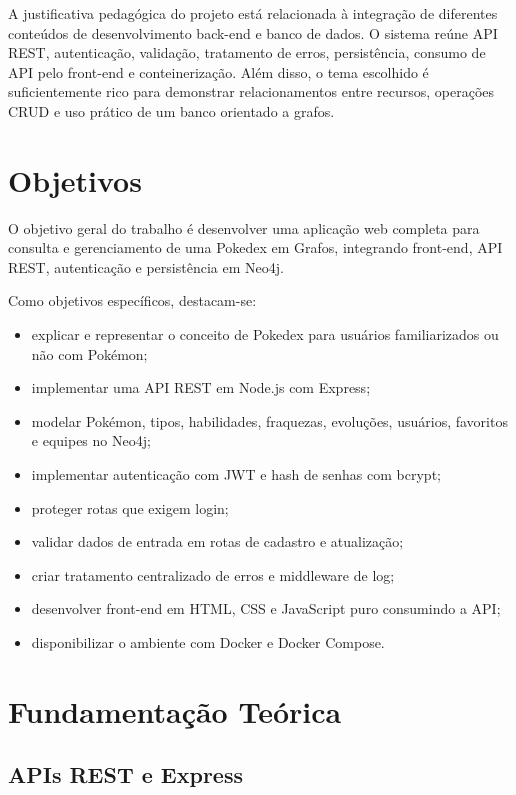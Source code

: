 \documentclass[12pt]{article}
\begin{document}
A justificativa pedagógica do projeto está relacionada à integração de diferentes conteúdos de desenvolvimento back-end e banco de dados. O sistema reúne API REST, autenticação, validação, tratamento de erros, persistência, consumo de API pelo front-end e conteinerização. Além disso, o tema escolhido é suficientemente rico para demonstrar relacionamentos entre recursos, operações CRUD e uso prático de um banco orientado a grafos.

\section{Objetivos}

O objetivo geral do trabalho é desenvolver uma aplicação web completa para consulta e gerenciamento de uma Pokedex em Grafos, integrando front-end, API REST, autenticação e persistência em Neo4j.

Como objetivos específicos, destacam-se:

\begin{itemize}
  \item explicar e representar o conceito de Pokedex para usuários familiarizados ou não com Pokémon;
  \item implementar uma API REST em Node.js com Express;
  \item modelar Pokémon, tipos, habilidades, fraquezas, evoluções, usuários, favoritos e equipes no Neo4j;
  \item implementar autenticação com JWT e hash de senhas com bcrypt;
  \item proteger rotas que exigem login;
  \item validar dados de entrada em rotas de cadastro e atualização;
  \item criar tratamento centralizado de erros e middleware de log;
  \item desenvolver front-end em HTML, CSS e JavaScript puro consumindo a API;
  \item disponibilizar o ambiente com Docker e Docker Compose.
\end{itemize}

\section{Fundamentação Teórica}

\subsection{APIs REST e Express}
\end{document}
